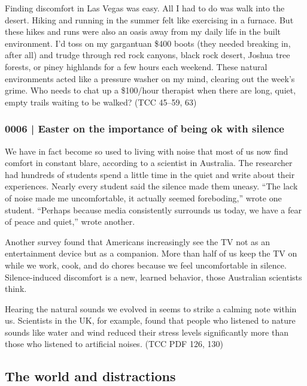 			Finding discomfort in Las Vegas was easy. All I had to do was walk into the desert. Hiking and running in the summer felt like exercising in a furnace. But these hikes and runs were also an oasis away from my daily life in the built environment. I'd toss on my gargantuan \$400 boots (they needed breaking in, after all) and trudge through red rock canyons, black rock desert, Joshua tree forests, or piney highlands for a few hours each weekend. These natural environments acted like a pressure washer on my mind, clearing out the week's grime. Who needs to chat up a \$100/hour therapist when there are long, quiet, empty trails waiting to be walked? (TCC 45--59, 63)
			
		\subsubsection{0006 | Easter on the importance of being ok with silence}
			\label{GM-LIFE-GROWTH-0006}
			
			We have in fact become so used to living with noise that most of us now find comfort in constant blare, according to a scientist in Australia. The researcher had hundreds of students spend a little time in the quiet and write about their experiences. Nearly every student said the silence made them uneasy. ``The lack of noise made me uncomfortable, it actually seemed foreboding,'' wrote one student. ``Perhaps because media consistently surrounds us today, we have a fear of peace and quiet,'' wrote another. 

			Another survey found that Americans increasingly see the TV not as an entertainment device but as a companion. More than half of us keep the TV on while we work, cook, and do chores because we feel uncomfortable in silence. Silence-induced discomfort is a new, learned behavior, those Australian scientists think.
			
			Hearing the natural sounds we evolved in seems to strike a calming note within us. Scientists in the UK, for example, found that people who listened to nature sounds like water and wind reduced their stress levels significantly more than those who listened to artificial noises. (TCC PDF 126, 130)
			
	\subsection{The world and distractions} %
		\label{GM-LIFE-WORLD}
		
